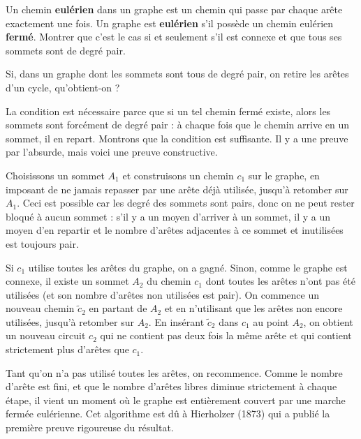 \begin{exo}
\label{EXO:grapheul}
Un chemin \textbf{eulérien} dans un graphe est un chemin qui passe par chaque arête exactement une fois. Un graphe est \textbf{eulérien} s'il possède un chemin eulérien \textbf{fermé}. Montrer que c'est le cas si et seulement s'il est connexe et que tous ses sommets sont de degré pair.

\begin{hint}
Si, dans un graphe dont les sommets sont tous de degré pair, on retire les arêtes d'un cycle, qu'obtient-on  ? 
\end{hint}
\begin{sol}
La condition est nécessaire parce que si un tel chemin fermé existe, alors les sommets sont forcément de degré pair : à chaque fois que le chemin arrive en un sommet, il en repart.
Montrons que la condition est suffisante. Il y a une preuve par l'absurde, mais voici une preuve constructive. 

Choisissons un sommet $A_1$ et construisons un chemin $c_1$ sur le graphe, en imposant de ne jamais repasser par une arête déjà utilisée, jusqu'à retomber sur $A_1$. Ceci est possible car les degré des sommets sont pairs, donc on ne peut rester bloqué à aucun sommet : s'il y a un moyen d'arriver à un sommet, il y a un moyen d'en repartir et le nombre d'arêtes adjacentes à ce sommet et inutilisées est toujours pair.

Si $c_1$ utilise toutes les arêtes du graphe, on a gagné. Sinon, comme le graphe est connexe, il existe un sommet $A_2$  du chemin $c_1$ dont toutes les arêtes n'ont pas été utilisées (et son nombre d'arêtes non utilisées est pair). On commence un nouveau chemin $\tilde c_2$ en partant de $A_2$ et en n'utilisant que les arêtes non encore utilisées, jusqu'à retomber sur $A_2$. En insérant $\tilde c_2$ dans $c_1$ au point $A_2$, on obtient un nouveau circuit $c_2$ qui ne contient pas deux fois la même arête et qui contient strictement plus d'arêtes que $c_1$. 

Tant qu'on n'a pas utilisé toutes les arêtes, on recommence. Comme le nombre d'arête est fini, et que le nombre d'arêtes libres diminue strictement à chaque étape, il vient un moment où le graphe est entièrement couvert par une marche fermée eulérienne. Cet algorithme est dû à Hierholzer (1873) qui a publié la première preuve rigoureuse du résultat.


\end{sol}
\end{exo}
